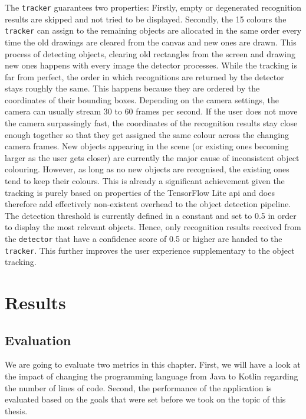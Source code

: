 \documentclass[
			   fontsize=11pt,
               paper=a4,
               bibliography=totoc,
               idxtotoc,
               headsepline,
               footsepline,
               footinclude=false,
               BCOR=12mm,
               DIV=13,
               openany,   %
               ]
               {scrbook}
\newcommand{\code}[1]{\lstinline[basicstyle = \ttfamily\small]{#1}} %
\begin{document}
The \code{tracker} guarantees two properties: Firstly, empty or degenerated recognition results are skipped and not tried to be displayed. Secondly, the 15 colours the \code{tracker} can assign to the remaining objects are  allocated in the same order every time the old drawings are cleared from the canvas and new ones are drawn. This process of detecting objects, clearing old rectangles from the screen and drawing new ones happens with every image the detector processes. While the tracking is far from perfect, the order in which recognitions are returned by the detector stays roughly the same. This happens because they are ordered by the coordinates of their bounding boxes. Depending on the camera settings, the camera can usually stream 30 to 60 frames per second. If the user does not move the camera surpassingly fast, the coordinates of the recognition results stay close enough together so that they get assigned the same colour across the changing camera frames. New objects appearing in the scene (or existing ones becoming larger as the user gets closer) are currently the major cause of inconsistent object colouring. However, as long as no new objects are recognised, the existing ones tend to keep their colours. This is already a significant achievement given the tracking is purely based on properties of the TensorFlow Lite \gls{api} and does therefore add effectively non-existent overhead to the object detection pipeline. \\

The detection threshold is currently defined in a constant and set to 0.5 in order to display the most relevant objects. Hence, only recognition results received from the \code{detector} that have a confidence score of 0.5 or higher are handed to the \code{tracker}. This further improves the user experience supplementary to the object tracking.

\part{Results}

\chapter{Evaluation}

We are going to evaluate two metrics in this chapter. First, we will have a look at the impact of changing the programming language from Java to Kotlin regarding the number of lines of code. Second, the performance of the application is evaluated based on the goals that were set before we took on the topic of this thesis.
\end{document}
